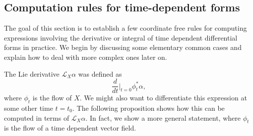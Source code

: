 \subsection{Computation rules for time-dependent forms}
The goal of this section is to establish a few coordinate free rules for computing expressions involving the derivative or integral of time dependent differential forms in practice. We begin by discussing some elementary common cases and explain how to deal with more complex ones later on. 

\vspace{.25cm}

\noindent The Lie derivative $\mathcal{L}_X\alpha$ was defined as
\[
\frac{d}{dt}\bigg|_{t=0}\phi_t^\ast\alpha,
\]
where $\phi_t$ is the flow of $X$. We might also want to differentiate this expression at some other time $t=t_0$. The following proposition shows how this can be computed in terms of $\mathcal{L}_X\alpha$. In fact, we show a more general statement, where $\phi_t$ is the flow of a time dependent vector field.

